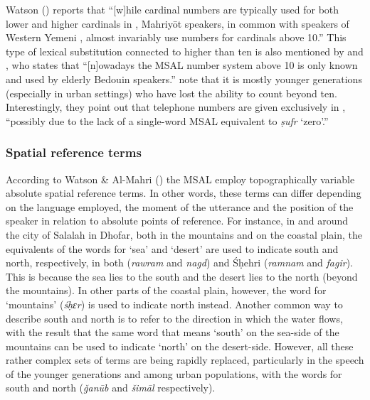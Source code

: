 \documentclass[output=paper]{langsci/langscibook}
\begin{document}
Watson (\citeyear[3]{Watson2012}) reports that ``[w]hile   cardinal numbers  are  typically  used  for  both  lower  and  higher  cardinals  in  , Mahriyōt  speakers,  in  common  with  speakers  of  Western  {Yemeni}  , almost invariably use  numbers for cardinals above 10.'' This type of lexical substitution connected to  higher than ten is also mentioned by \citet{Lonnet2011} and \citet[1088]{Simeone-Senelle2011}, who states that ``[n]owadays the MSAL number system above 10 is only known and used by elderly Bedouin speakers.'' \citet[90]{WatsonAl-Mahri2017} note that it is mostly younger generations (especially in urban settings) who have lost the ability to count beyond ten. Interestingly, they point out that telephone numbers are given exclusively in , “possibly due to the lack of a single-word MSAL equivalent to  \textit{ṣufr} ‘zero’.”


 \subsubsection{Spatial reference terms}

According to Watson \& Al-Mahri (\citeyear[91]{WatsonAl-Mahri2017}) the MSAL employ topographically variable absolute spatial reference terms. In other words, these terms can differ depending on the language employed, the moment of the utterance and the position of the speaker in relation to absolute points of reference. For instance, in and around the city of Salalah in Dhofar, both in the mountains and on the coastal plain, the equivalents of the words for ‘sea’ and ‘desert’ are used to indicate south and north, respectively, in both  (\textit{rawram} and \textit{nagd}) and Śḥehri (\textit{ramnam} and \textit{fagir}). This is because the sea lies to the south and the desert lies to the north (beyond the mountains). In other parts of the coastal plain, however, the word for ‘mountains’ (\textit{śḥɛr}) is used to indicate north instead. Another common way to describe south and north is to refer to the direction in which the water flows, with the result that the same word that means ‘south’ on the sea-side of the mountains can be used to indicate ‘north’ on the desert-side. However, all these rather complex sets of terms are being rapidly replaced, particularly in the speech of the younger generations and among urban populations, with the  words for south and north (\textit{ǧanūb} and \textit{šimāl} respectively).
\end{document}
